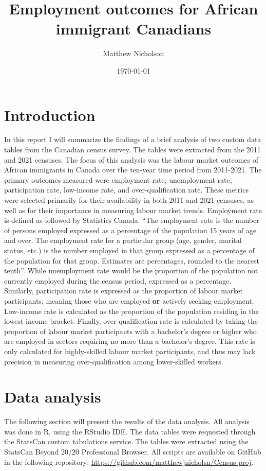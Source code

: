 \documentclass[12pt]{article}
\title{Employment outcomes for African immigrant Canadians}
\author{Matthew Nicholson}
\date{\today}
\begin{document}
\maketitle

\section*{Introduction}
In this report I will summarize the findings of a brief analysis of two custom data tables from the Canadian census survey. The tables were extracted from the 2011 and 2021 censuses. The focus of this analysis was the labour market outcomes of African immigrants in Canada over the ten-year time period from 2011-2021. The primary outcomes measured were employment rate, unemployment rate, participation rate, low-income rate, and over-qualification rate. These metrics were selected primarily for their availability in both 2011 and 2021 censuses, as well as for their importance in measuring labour market trends. Employment rate is defined as followed by Statistics Canada: ``The employment rate is the number of persons employed expressed as a percentage of the population 15 years of age and over. The employment rate for a particular group (age, gender, marital status, etc.) is the number employed in that group expressed as a percentage of the population for that group. Estimates are percentages, rounded to the nearest tenth''. While unemployment rate would be the proportion of the population not currently employed during the census period, expressed as a percentage. Similarly, participation rate is expressed as the proportion of labour market participants, meaning those who are employed \textbf{or} actively seeking employment. Low-income rate is calculated as the proportion of the population residing in the lowest income bracket. Finally, over-qualification rate is calculated by taking the proportion of labour market participants with a bachelor's degree or higher who are employed in sectors requiring no more than a bachelor's degree. This rate is only calculated for highly-skilled labour market participants, and thus may lack precision in measuring over-qualification among lower-skilled workers.

\section*{Data analysis}

The following section will present the results of the data analysis. All analysis was done in R, using the RStudio IDE. The data tables were requested through the StatsCan custom tabulations service. The tables were extracted using the StatsCan Beyond 20/20 Professional Browser. All scripts are available on GitHub in the following repository: \url{https://github.com/matthewjnicholsn/Census-proj}. \\
\end{document}
